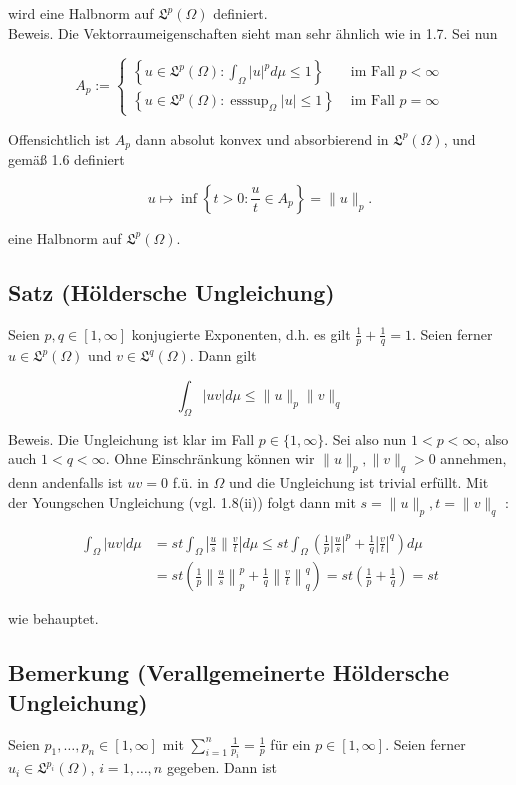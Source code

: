 \documentclass[10pt, letterpaper]{article}
\begin{document}
wird eine Halbnorm auf $\mathfrak{L}^{p}(\Omega)$ definiert.\\
Beweis. Die Vektorraumeigenschaften sieht man sehr ähnlich wie in 1.7. Sei nun

$$
A_{p}:= \begin{cases}\left\{u \in \mathfrak{L}^{p}(\Omega): \int_{\Omega}|u|^{p} d \mu \leq 1\right\} & \text { im Fall } p<\infty \\ \left\{u \in \mathfrak{L}^{p}(\Omega): \operatorname{esssup}_{\Omega}|u| \leq 1\right\} & \text { im Fall } p=\infty\end{cases}
$$

Offensichtlich ist $A_{p}$ dann absolut konvex und absorbierend in $\mathfrak{L}^{p}(\Omega)$, und gemäß 1.6 definiert

$$
u \mapsto \inf \left\{t>0: \frac{u}{t} \in A_{p}\right\}=\|u\|_{p} .
$$

eine Halbnorm auf $\mathfrak{L}^{p}(\Omega)$.

\subsection*{Satz (Höldersche Ungleichung)}
Seien $p, q \in[1, \infty]$ konjugierte Exponenten, d.h. es gilt $\frac{1}{p}+\frac{1}{q}=1$. Seien ferner $u \in \mathfrak{L}^{p}(\Omega)$ und $v \in \mathfrak{L}^{q}(\Omega)$. Dann gilt

$$
\int_{\Omega}|u v| d \mu \leq\|u\|_{p}\|v\|_{q}
$$

Beweis. Die Ungleichung ist klar im Fall $p \in\{1, \infty\}$. Sei also nun $1<p<\infty$, also auch $1<q<\infty$. Ohne Einschränkung können wir $\|u\|_{p},\|v\|_{q}>0$ annehmen, denn andenfalls ist $u v=0$ f.ü. in $\Omega$ und die Ungleichung ist trivial erfüllt. Mit der Youngschen Ungleichung (vgl. 1.8(ii)) folgt dann mit $s=\|u\|_{p}, t=\|v\|_{q}$ :

$$
\begin{aligned}
\int_{\Omega}|u v| d \mu & =s t \int_{\Omega}\left|\frac{u}{s} \| \frac{v}{t}\right| d \mu \leq s t \int_{\Omega}\left(\frac{1}{p}\left|\frac{u}{s}\right|^{p}+\frac{1}{q}\left|\frac{v}{t}\right|^{q}\right) d \mu \\
& =s t\left(\frac{1}{p}\left\|\frac{u}{s}\right\|_{p}^{p}+\frac{1}{q}\left\|\frac{v}{t}\right\|_{q}^{q}\right)=s t\left(\frac{1}{p}+\frac{1}{q}\right)=s t
\end{aligned}
$$

wie behauptet.

\subsection*{Bemerkung (Verallgemeinerte Höldersche Ungleichung)}
Seien $p_{1}, \ldots, p_{n} \in[1, \infty]$ mit $\sum_{i=1}^{n} \frac{1}{p_{i}}=\frac{1}{p}$ für ein $p \in[1, \infty]$. Seien ferner $u_{i} \in \mathfrak{L}^{p_{i}}(\Omega)$, $i=1, \ldots, n$ gegeben. Dann ist
\end{document}
